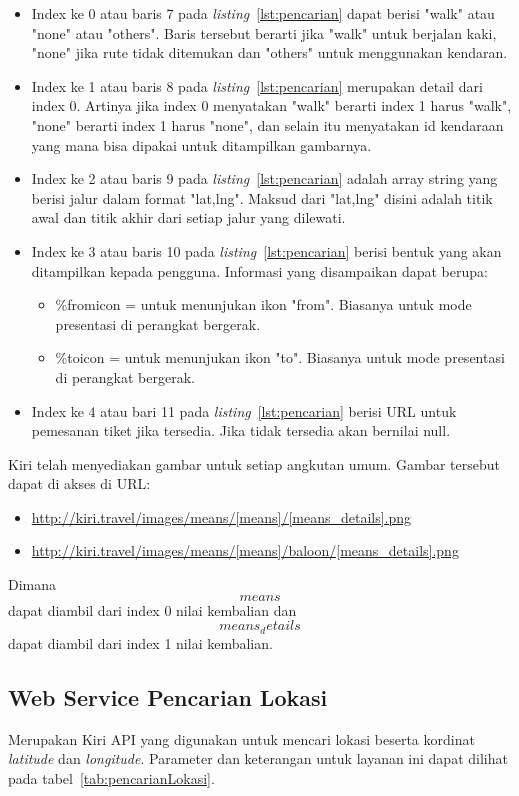 \begin{itemize}
	\item Index ke 0 atau baris 7 pada \textit{listing}~\ref{lst:pencarian} dapat berisi "walk" atau "none" atau "others". Baris tersebut berarti jika "walk" untuk berjalan kaki, "none" jika rute tidak ditemukan dan "others" untuk menggunakan kendaran.
	\item Index ke 1 atau baris 8 pada \textit{listing}~\ref{lst:pencarian} merupakan detail dari index 0. Artinya jika index 0 menyatakan "walk" berarti index 1 harus "walk", "none" berarti index 1 harus "none", dan selain itu menyatakan id kendaraan yang mana bisa dipakai untuk ditampilkan gambarnya.
	\item Index ke 2 atau baris 9 pada \textit{listing}~\ref{lst:pencarian} adalah array string yang berisi jalur dalam format "lat,lng". Maksud dari "lat,lng" disini adalah titik awal dan titik akhir dari setiap jalur yang dilewati.
	\item Index ke 3 atau baris 10 pada \textit{listing}~\ref{lst:pencarian} berisi bentuk yang akan ditampilkan kepada pengguna. Informasi yang disampaikan dapat berupa:
		\begin{itemize}
			\item \%fromicon = untuk menunjukan ikon "from". Biasanya untuk mode presentasi di perangkat bergerak.
			\item \%toicon = untuk menunjukan ikon "to". Biasanya untuk mode presentasi di perangkat bergerak. 
		\end{itemize}
	\item Index ke 4 atau bari 11 pada \textit{listing}~\ref{lst:pencarian} berisi URL untuk pemesanan tiket jika tersedia. Jika tidak tersedia akan bernilai null.
\end{itemize}

\hspace{0.5cm} Kiri telah menyediakan gambar untuk setiap angkutan umum. Gambar tersebut dapat di akses di URL:
\begin{itemize}
	\item \url{http://kiri.travel/images/means/[means]/[means_details].png}
	\item \url{http://kiri.travel/images/means/[means]/baloon/[means_details].png}
\end{itemize}
Dimana \[means\] dapat diambil dari index 0 nilai kembalian dan \[means_details\] dapat diambil dari index 1 nilai kembalian. 
		
\subsection{Web Service Pencarian Lokasi}
\label{subsec:Pencarian Lokasi Service}
\hspace{0.5cm} Merupakan Kiri API yang digunakan untuk mencari lokasi beserta kordinat \textit{latitude} dan \textit{longitude}. Parameter dan keterangan untuk layanan ini dapat dilihat pada tabel~\ref{tab:pencarianLokasi}.

